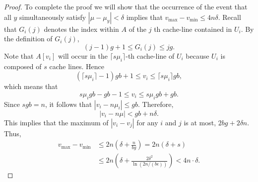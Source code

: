 \documentclass[11pt]{article}
\theoremstyle{remark}
\theoremstyle{remark}
\begin{document}
\begin{proof}


To complete the proof we will show that the occurrence of the event
that all $y$ simultaneously satisfy $|\mu - \mu_y| < \delta$ implies
that $v_{\text{max}} - v_{\text{min}} \le 4n\delta$.
  Recall that $G_i(j)$ denotes the index within $A$ of the $j$ th cache-line contained in $U_i$. By the definition of $G_i(j)$, $$(j - 1)g + 1 \le G_i(j) \le jg.$$ Note that $A[v_i]$ will occur in the $\lceil s\mu_i \rceil$-th cache-line of $U_i$ because $U_i$ is composed of $s$ cache lines. Hence $$(\lceil s\mu_i \rceil - 1) g b + 1 \le v_i \le \lceil s\mu_i \rceil g b,$$
  which means that
  $$s\mu_i g b - gb - 1 \le v_i \le s\mu_i g b + gb.$$ Since $sgb =
  n$, it follows that $|v_i - n \mu_i| \le gb$. Therefore,
  $$|v_i - n \mu| < gb + n\delta.$$
  This
implies that the maximum of $|v_i - v_j|$ for
any $i$ and $j$ is at most, $2bg + 2\delta n$. Thus,
\begin{align*}
  v_{\text{max}} - v_{\text{min}} & \le 2n \left( \delta + \frac{n}{bg} \right)  = 2n \left( \delta + s \right) \\
  & \le 2n \left(\delta + \frac{2\delta^2}{\ln (2n / (b\epsilon))}\right) < 4n\cdot\delta.
\end{align*}
\end{proof}
\end{document}
